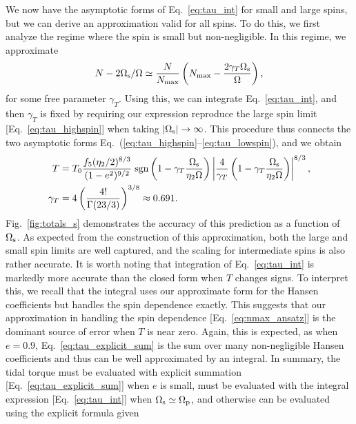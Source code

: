 \documentclass[
        fleqn,
        usenatbib,
    ]{mnras}
\newcommand*{\abs}[1]{\left|#1\right|}
\newcommand*{\p}[1]{\left(#1\right)}
\begin{document}
We now have the asymptotic forms of Eq.~\eqref{eq:tau_int} for small and large
spins, but we can derive an approximation valid for all spins. To do this, we
first analyze the regime where the spin is small but non-negligible. In this
regime, we approximate
\begin{equation}
    N - 2\Omega_{\rm s} / \Omega \simeq \frac{N}{N_{\max}}
        \left(N_{\max} - \frac{2\gamma_T
        \Omega_{\rm s}}{\Omega}\right)\label{eq:nmax_ansatz},
\end{equation}
for some free parameter $\gamma_T$. Using this, we can integrate
Eq.~\eqref{eq:tau_int}, and then $\gamma_T$ is fixed by requiring our
expression reproduce the large spin limit [Eq.~\eqref{eq:tau_highspin}] when
taking $\abs{\Omega_{\rm s}} \to \infty$. This procedure thus connects the two
asymptotic forms Eq.~(\ref{eq:tau_highspin}--\ref{eq:tau_lowspin}), and we
obtain
\begin{align}
    T &= T_0 \frac{f_5 (\eta_2/2)^{8/3}}{(1 - e^2)^{9/2}}
        \;\mathrm{sgn}\left(1 - \gamma_T\frac{\Omega_{\rm s}}{\eta_2\Omega}\right)
            \left|
                \frac{4}{\gamma_T}
                \p{1 - \gamma_T\frac{\Omega_{\rm s}}{\eta_2\Omega}}
            \right|^{8/3} ,\label{eq:tau_approx}\\
    \gamma_T &= 4\p{\frac{4!}{\Gamma(23/3)}}^{3/8} \approx 0.691.
\end{align}
Fig.~\ref{fig:totals_s} demonstrates the accuracy of
this prediction as a function of $\Omega_{\rm s}$. As expected from the
construction of this approximation, both the large and small spin limits are
well captured, and the scaling for intermediate spins is also rather accurate.
It is worth noting that integration of Eq.~\eqref{eq:tau_int} is markedly more
accurate than the closed form when $T$ changes signs. To interpret this, we
recall that the integral uses our approximate form for the Hansen coefficients
but handles the spin dependence exactly. This suggests that our approximation in
handling the spin dependence [Eq.~\eqref{eq:nmax_ansatz}] is the dominant source
of error when $T$ is near zero. Again, this is expected, as when $e = 0.9$,
Eq.~\eqref{eq:tau_explicit_sum} is the sum over many non-negligible Hansen
coefficients and thus can be well approximated by an integral. In summary, the
tidal torque must be evaluated with explicit summation
[Eq.~\eqref{eq:tau_explicit_sum}] when $e$ is small, must be evaluated with
the integral expression [Eq.~\eqref{eq:tau_int}] when $\Omega_{\rm s} \simeq
\Omega_{\rm p}$, and otherwise can be evaluated using the explicit formula given
\end{document}
